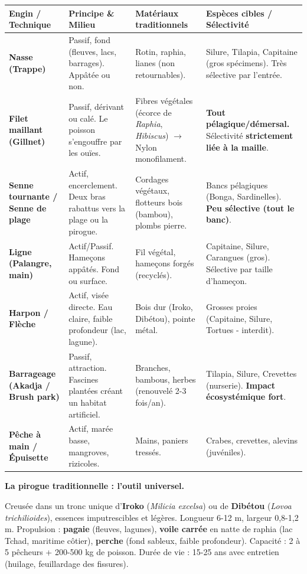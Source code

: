 \documentclass[11pt]{article}
\begin{document}
\begin{center}
\begin{tabularx}{\linewidth}{|l|X|X|X|}\hline
\rowcolor{popblueL}
\textbf{Engin / Technique} & \textbf{Principe \& Milieu} & \textbf{Matériaux traditionnels} & \textbf{Espèces cibles / Sélectivité} \\ \hline
\textbf{Nasse (Trappe)} & Passif, fond (fleuves, lacs, barrages). Appâtée ou non. & Rotin, raphia, lianes (non retournables). & Silure, Tilapia, Capitaine (gros spécimens). Très sélective par l'entrée. \\ \hline
\textbf{Filet maillant (Gillnet)} & Passif, dérivant ou calé. Le poisson s'engouffre par les ouïes. & Fibres végétales (écorce de \emph{Raphia}, \emph{Hibiscus}) $\rightarrow$ Nylon monofilament. & \textbf{Tout pélagique/démersal.} Sélectivité \textbf{strictement liée à la maille}. \\ \hline
\textbf{Senne tournante / Senne de plage} & Actif, encerclement. Deux bras rabattus vers la plage ou la pirogue. & Cordages végétaux, flotteurs bois (bambou), plombs pierre. & Bancs pélagiques (Bonga, Sardinelles). \textbf{Peu sélective (tout le banc)}. \\ \hline
\textbf{Ligne (Palangre, main)} & Actif/Passif. Hameçons appâtés. Fond ou surface. & Fil végétal, hameçons forgés (recyclés). & Capitaine, Silure, Carangues (gros). Sélective par taille d'hameçon. \\ \hline
\textbf{Harpon / Flèche} & Actif, visée directe. Eau claire, faible profondeur (lac, lagune). & Bois dur (Iroko, Dibétou), pointe métal. & Grosses proies (Capitaine, Silure, Tortues - interdit). \\ \hline
\textbf{Barrageage (Akadja / Brush park)} & Passif, attraction. Fascines plantées créant un habitat artificiel. & Branches, bambous, herbes (renouvelé 2-3 fois/an). & Tilapia, Silure, Crevettes (nurserie). \textbf{Impact écosystémique fort}. \\ \hline
\textbf{Pêche à main / Épuisette} & Actif, marée basse, mangroves, rizicoles. & Mains, paniers tressés. & Crabes, crevettes, alevins (juvéniles). \\ \hline
\end{tabularx}
\end{center}

\textbf{La pirogue traditionnelle : l'outil universel.}\par
Creusée dans un tronc unique d'\textbf{Iroko} (\emph{Milicia excelsa}) ou de \textbf{Dibétou} (\emph{Lovoa trichilioides}), essences imputrescibles et légères. Longueur 6-12 m, largeur 0,8-1,2 m. Propulsion : \textbf{pagaie} (fleuves, lagunes), \textbf{voile carrée} en natte de raphia (lac Tchad, maritime côtier), \textbf{perche} (fond sableux, faible profondeur). Capacité : 2 à 5 pêcheurs + 200-500 kg de poisson. Durée de vie : 15-25 ans avec entretien (huilage, feuillardage des fissures).
\end{document}
